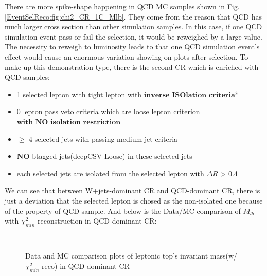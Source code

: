 		There are more spike-shape happening in QCD MC samples shown in Fig.\ref{EventSelReco:fig:chi2_CR_1C_Mlb}. They come from the reason that QCD has much larger cross section than other simulation samples. In this case, if one QCD simulation event pass or fail the selection, it would be reweighed by a large value. The necessity to reweigh to luminosity leads to that one QCD simulation event's effect would cause an enormous variation showing on plots after selection. To make up this demonstration type, there is the second CR which is enriched with QCD samples:

		\begin{itemize}
	  		\item 1 selected lepton with tight lepton with $\textbf{inverse ISOlation criteria}$*
	  		\item 0 lepton pass veto criteria which are loose lepton criterion $\textbf{with NO isolation restriction}$
	  		\item $\geq$ 4 selected jets with passing medium jet criteria
	  		\item $\textbf{NO}$ btagged jets(deepCSV Loose) in these selected jets
	  		\item each selected jets are isolated from the selected lepton with $\Delta R$ > 0.4
	  	\label{EventSelReco:itm:full_sel_CR2}
		\end{itemize}

		We can see that between W+jets-dominant CR and QCD-dominant CR, there is just a deviation that the selected lepton is chosed as the non-isolated one because of the property of QCD sample. And below is the Data/MC comparison of $M_{lb}$ with $\chi^2_{min}$ reconstruction in QCD-dominant CR:

		\begin{figure}[H]
		\centering
			\\
		\caption{Data and MC comparison plots of leptonic top's invariant mass(w/ $\chi^2_{min}$-reco) in QCD-dominant CR}
		\label{EventSelReco:fig:chi2_CR2_1C_Mlb}
		\end{figure}
		\FloatBarrier

